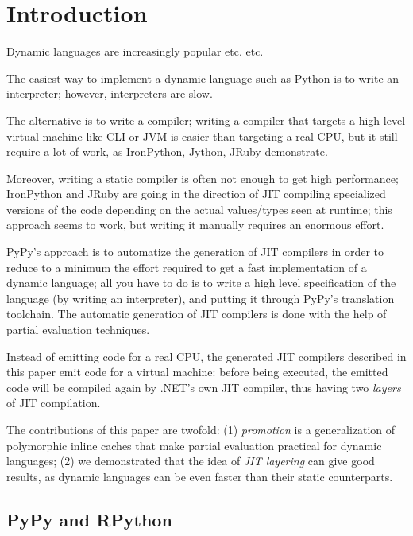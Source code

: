 \section{Introduction}

Dynamic languages are increasingly popular etc. etc.

The easiest way to implement a dynamic language such as Python is to write an
interpreter; however, interpreters are slow.

The alternative is to write a compiler; writing a compiler that targets a high
level virtual machine like CLI or JVM is easier than targeting a real CPU, but
it still require a lot of work, as IronPython, Jython, JRuby demonstrate.

Moreover, writing a static compiler is often not enough to get high
performance; IronPython and JRuby are going in the direction of JIT compiling
specialized versions of the code depending on the actual values/types seen at
runtime; this approach seems to work, but writing it manually requires an
enormous effort.

PyPy's approach \cite{RiBo07_223} is to automatize the generation of JIT compilers in order
to reduce to a minimum the effort required to get a fast implementation of a
dynamic language; all you have to do is to write a high level specification of
the language (by writing an interpreter), and putting it through PyPy's
translation toolchain. The automatic generation of JIT compilers is done with
the help of partial evaluation techniques.

Instead of emitting code for a real CPU, the generated JIT compilers described
in this paper emit code for a virtual machine: before being executed, the
emitted code will be compiled again by .NET's own JIT compiler, thus having
two \emph{layers} of JIT compilation.

The contributions of this paper are twofold: (1) \emph{promotion} is a
generalization of polymorphic inline caches that make partial evaluation
practical for dynamic languages; (2) we demonstrated that the idea of
\emph{JIT layering} can give good results, as dynamic languages can be even
faster than their static counterparts.

\subsection{PyPy and RPython}

